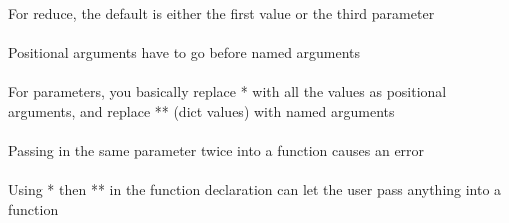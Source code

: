 \documentclass{article}
\begin{document}
\begin{multicols}{3}
For reduce, the default is either the first value or the third parameter\\\\
Positional arguments have to go before named arguments\\\\
For parameters, you basically replace * with all the values as positional arguments, and replace ** (dict values) with named arguments\\\\
Passing in the same parameter twice into a function causes an error\\\\
Using * then ** in the function declaration can let the user pass anything into a function\\\\

\end{multicols}
\end{document}
